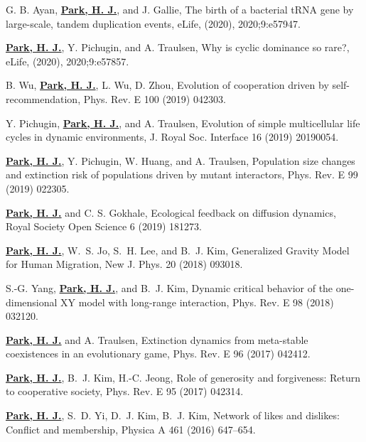 \documentclass[11pt,a4paper,sans]{moderncv}        %
\begin{document}
\begin{etaremune}
\item
G. B. Ayan, \underline{\textbf{Park, H. J.}}, and J. Gallie, The birth of a bacterial tRNA gene by large-scale, tandem duplication events, eLife, (2020), 2020;9:e57947.

\item
\underline{\textbf{Park, H. J.}}, Y. Pichugin, and A. Traulsen, Why is cyclic dominance so rare?,  eLife, (2020),  2020;9:e57857.

\item
B. Wu, \underline{\textbf{Park, H. J.}}, L. Wu, D. Zhou,
Evolution of cooperation driven by self-recommendation, Phys. Rev. E 100 (2019) 042303.
  
\item
Y. Pichugin, \underline{\textbf{Park, H. J.}}, and A. Traulsen,
Evolution of simple multicellular life cycles in dynamic environments, J. Royal Soc. Interface 16 (2019) 20190054.
  
\item
\underline{\textbf{Park, H. J.}}, Y. Pichugin, W. Huang, and A. Traulsen,
Population size changes and extinction risk of populations driven by mutant interactors, Phys. Rev. E 99 (2019) 022305.

\item
\underline{\textbf{Park, H. J.}} and C. S. Gokhale,
Ecological feedback on diffusion dynamics, Royal Society Open Science 6 (2019) 181273.


\item
\underline{\textbf{Park, H. J.}}, W.~S. Jo, S.~H. Lee, and B.~J. Kim,
Generalized Gravity Model for Human Migration, New J. Phys. 20 (2018) 093018.


\item
S.-G. Yang, \underline{\textbf{Park, H. J.}}, and B.~J. Kim,
Dynamic critical behavior of the one-dimensional XY model with long-range interaction, Phys. Rev. E 98 (2018) 032120.


\item
\underline{\textbf{Park, H. J.}} and A. Traulsen,
Extinction dynamics from meta-stable coexistences in an evolutionary game, 
Phys. Rev. E 96 (2017) 042412.


\item
\underline{\textbf{Park, H. J.}}, B.~J. Kim, H.-C. Jeong, Role of generosity
  and forgiveness: Return to cooperative society, Phys. Rev. E 95 (2017)
  042314.

\item
\underline{\textbf{Park, H. J.}}, S.~D. Yi, D.~J. Kim, B.~J. Kim, Network of
  likes and dislikes: Conflict and membership, Physica A 461 (2016) 647--654.


\end{etaremune}
\end{document}
